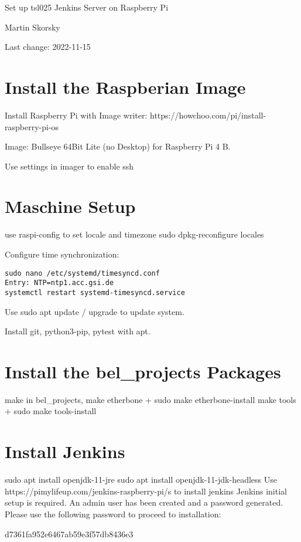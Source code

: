 \documentclass[12pt,a4paper]{report}
\begin{document}
\begin{titlepage}
\vspace{2cm}
\begin{center}
\Huge{Set up tsl025 Jenkins Server on Raspberry Pi}

\Large{Martin Skorsky}

\Large{Last change: 2022-11-15}
\end{center}
\vfill
\end{titlepage}

\tableofcontents

\chapter{Install the Raspberian Image}
Install Raspberry Pi with Image writer:
https://howchoo.com/pi/install-raspberry-pi-os

Image: Bullseye 64Bit Lite (no Desktop) for Raspberry Pi 4 B.

Use settings in imager to enable ssh

\chapter{Maschine Setup}
use raspi-config to set locale and timezone
sudo dpkg-reconfigure locales

Configure time synchronization:
\begin{verbatim}
sudo nano /etc/systemd/timesyncd.conf
Entry: NTP=ntp1.acc.gsi.de
systemctl restart systemd-timesyncd.service
\end{verbatim}
Use sudo apt update / upgrade to update system.

Install git, python3-pip, pytest with apt.
\chapter{Install the bel\_projects Packages}
make in bel\_projects, 
make etherbone + sudo make etherbone-install
make tools + sudo make tools-install
\chapter{Install Jenkins}
sudo apt install openjdk-11-jre
sudo apt install openjdk-11-jdk-headless
Use https://pimylifeup.com/jenkins-raspberry-pi/s to install jenkins
Jenkins initial setup is required. An admin user has been created and a password generated.
Please use the following password to proceed to installation:

d7361fa952e6467ab59e3f57db8436e3
\end{document}
